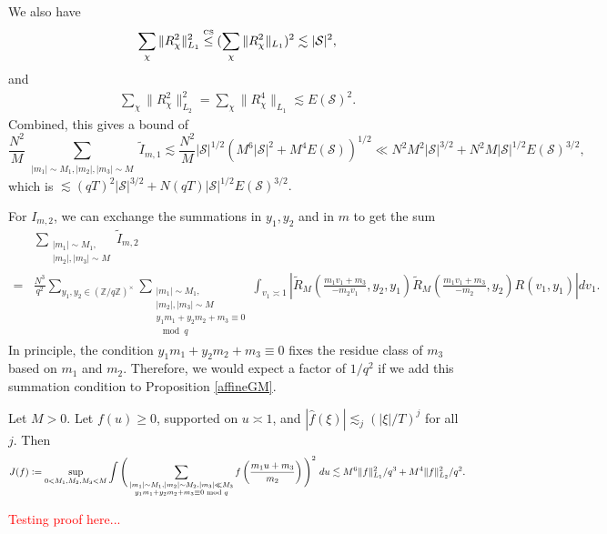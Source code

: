 We also have \begin{align*}
    \sum_{\chi} \|R_\chi^2\|_{L_1}^2\stackon{CS}{\leq}(\sum_{\chi} \|R_\chi^2\|_{L_1})^2 \lesssim |\mathcal{S}|^2,
\end{align*}
and\begin{align*}
    \sum_{\chi} \|R_\chi^2\|_{L_2}^2=\sum_{\chi} \|R_\chi^4\|_{L_1} \lesssim E(\mathcal{S})^2.
\end{align*}
Combined, this gives a bound of \[
    \frac{N^2}{M}\sum_{\substack {|m_1|\sim M_1,|m_2|,|m_3|\sim M}}\tilde{I}_{m,1}\lesssim \frac{N^2}{M} |\mathcal{S}|^{1/2} (M^6|\mathcal{S}|^{2}+M^4E(\mathcal{S}))^{1/2}\ll N^2 M^2|\mathcal{S}|^{3/2} + N^2M |\mathcal{S}|^{1/2}E(\mathcal{S})^{3/2},
\]
which is $\lesssim (qT)^{2}|\mathcal{S}|^{3/2}+N(qT)|\mathcal{S}|^{1/2}E(\mathcal{S})^{3/2}.$


For $I_{m,2}$, we can exchange the summations in $y_1,y_2$ and in $m$ to get the sum \begin{align*}
    &\sum_{\substack {|m_1|\sim M_1,\\|m_2|,|m_3|\sim M}}\tilde{I}_{m,2}\\=&\frac{N^3}{q^2} \sum_{y_1,y_2 \in(\mathbb{Z}/q\mathbb{Z})^\times} \sum_{\substack {|m_1|\sim M_1,\\|m_2|,|m_3|\sim M\\ y_1m_1+y_2m_2+m_3\equiv 0\\ \mod q}}\int_{v_1\asymp 1} \left| \tilde{R}_M\left(\frac{m_1v_1+m_3}{-m_2v_1},y_2,y_1\right)
    \tilde{R}_M(\frac{m_1v_1+m_3}{-m_2},y_2)R\left(v_1,y_1\right)\right| dv_1.
\end{align*}
In principle, the condition $y_1m_1+y_2m_2+m_3\equiv 0$ fixes the residue class of $m_3$ based on $m_1$ and $m_2$. Therefore, we would expect a factor of $1/q^2$ if we add this summation condition to Proposition \ref{affineGM}. 
\begin{lemma}\label{affinetrans}
    Let $M>0$. Let $f(u)\geq 0$, supported on $u\asymp 1$, and $|\hat{f}(\xi)|\lesssim_j (|\xi|/T)^j$ for all $j$. Then \[
        J(f)\mathrel{\mathop:}= \sup_{0<M_1,M_2,M_3<M} \int\Bigg( \sum_{\substack{|m_1|\sim M_1,|m_2|\sim M_2 , |m_3|\ll M_3\\ y_1m_1+y_2m_2+m_3\equiv 0 \textrm{ mod } q}} f\left(\frac{m_1 u+m_3}{m_2}\right)\Bigg)^2 \ du \lesssim M^6 \|f\|_{L_1}^2/q^3+M^4\|f\|_{L_2}^2/q^2.
    \] 
\end{lemma}
\textcolor{red}{Testing proof here...}

